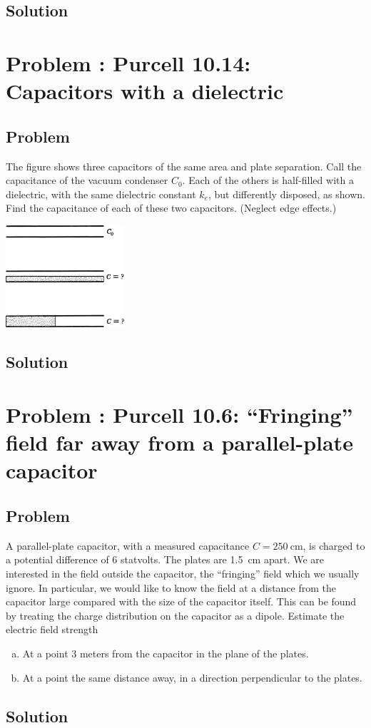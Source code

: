 \documentclass[solutions]{esg8022pset}
\begin{document}
\subsection{Solution}

\section{Problem \thesection: Purcell 10.14: Capacitors with a dielectric}
\subsection{Problem}
  The figure shows three capacitors of the same area and plate
  separation. Call the capacitance of the vacuum condenser $C_0$. Each of
  the others is half-filled with a dielectric, with the same dielectric constant
  $k_e$, but differently disposed, as shown. Find the capacitance of
  each of these two capacitors. (Neglect edge effects.)
  \begin{center}\includegraphics[width=0.33\textwidth]{ps04_08}\end{center}
\subsection{Solution}

\section{Problem \thesection: Purcell 10.6: ``Fringing'' field far away from a parallel-plate capacitor}
\subsection{Problem}
  A parallel-plate capacitor, with a measured capacitance $C = \SI{250}{\centi\meter}$,
  is charged to a potential difference of 6 statvolts. The plates
  are \SI{1.5}{\centi\meter} apart. We are interested in the field outside the capacitor,
  the ``fringing'' field which we usually ignore. In particular, we would
  like to know the field at a distance from the capacitor large compared
  with the size of the capacitor itself. This can be found by treating the
  charge distribution on the capacitor as a dipole. Estimate the electric
  field strength
  \begin{enumerate}[(a)]
    \item At a point 3 meters from the capacitor in the plane of the plates.
    \item At a point the same distance away, in a direction perpendicular to the plates.
  \end{enumerate}
\subsection{Solution}
\end{document}
